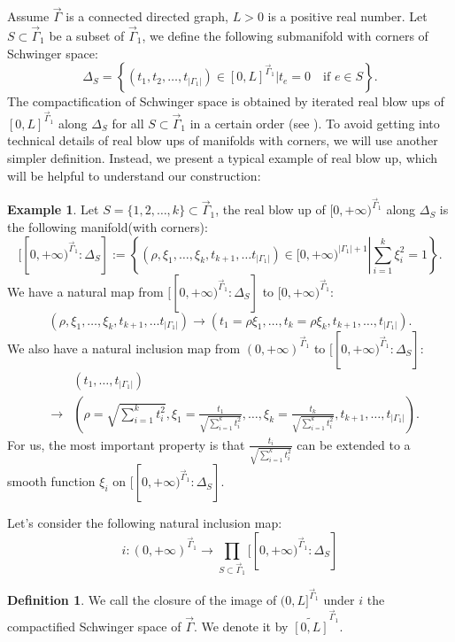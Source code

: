 \documentclass[11pt]{amsart}
\theoremstyle{definition}
\newtheorem{exa}[thm]{Example}
\newtheorem{defn}[thm]{Definition}
\theoremstyle{remark}
\numberwithin{equation}{section}
\begin{document}
Assume $\vec{\Gamma}$ is a connected directed graph, $L > 0$ is a positive real
number. Let $S \subset \vec{\Gamma}_1$ be a subset of $\vec{\Gamma}_1$, we define the
following submanifold with corners of Schwinger space:
\[ \Delta_S = \left\{ (t_1, t_2, \ldots, t_{| \Gamma_1 |}) \in [0, L]^{\vec{\Gamma}_1} |  t_e = 0 \quad \text{if } e \in S \right\} . \]
The compactification of Schwinger space is obtained by iterated real blow ups
of $[0, L]^{\vec{\Gamma}_1}$ along $\Delta_S$ for all $S \subset \vec{\Gamma}_1$ in
a certain order (see {\cite{Ammann2019ACO,epub47792}}). To avoid getting into
technical details of real blow ups of manifolds with corners, we will use
another simpler definition. Instead, we present a typical example of real blow
up, which will be helpful to understand our construction:
\begin{exa}
  Let $S = \{ 1, 2, \ldots, k \} \subset \vec{\Gamma}_1$, the real blow up of $[0,
  + \infty)^{\vec{\Gamma}_1}$ along $\Delta_S$ is the following manifold(with
  corners):
  \[ [[0, + \infty)^{\vec{\Gamma}_1 } : \Delta_S] := \left\{ (\rho, \xi_1,
     \ldots, \xi_k, t_{k + 1}, \ldots t_{| \Gamma_1 |}) \in [0, + \infty)^{|
     \Gamma_1 | + 1} \left| \sum_{i = 1}^k \xi_i^2 = 1 \right. \right\} . \]
  We have a natural map from $[[0, + \infty)^{\vec{\Gamma}_1 } : \Delta_S]$ to
  $[0, + \infty)^{\vec{\Gamma}_1 }$:
  \[ (\rho, \xi_1, \ldots, \xi_k, t_{k + 1}, \ldots t_{| \Gamma_1 |})
     \rightarrow (t_1 = \rho \xi_1, \ldots, t_k = \rho \xi_k, t_{k + 1},
     \ldots, t_{| \Gamma_1 |}) . \]
  We also have a natural inclusion map from $(0, + \infty)^{\vec{\Gamma}_1 }$ to
  $[[0, + \infty)^{\vec{\Gamma}_1 } : \Delta_S]$:
  \begin{eqnarray*}
    &  & (t_1, \ldots, t_{| \Gamma_1 |})\\
    & \rightarrow & \left( \rho = \sqrt{\sum_{i = 1}^k t_i^2}, \xi_1 =
    \frac{t_1}{\sqrt{\sum_{i = 1}^k t_i^2}}, \ldots, \xi_k =
    \frac{t_k}{\sqrt{\sum_{i = 1}^k t_i^2}}, t_{k + 1}, \ldots, t_{| \Gamma_1
    |} \right) .
  \end{eqnarray*}
  For us, the most important property is that $\frac{t_i}{\sqrt{\sum_{i = 1}^k
  t_i^2}}$ can be extended to a smooth function $\xi_i$ on $[[0, + \infty)^{\vec{\Gamma}_1 } : \Delta_S]$.
\end{exa}

Let's consider the following natural inclusion map:
\[ i : (0, + \infty)^{\vec{\Gamma}_1 } \rightarrow \prod_{S \subset \vec{\Gamma}_1}
   [[0, + \infty)^{\vec{\Gamma}_1 } : \Delta_S] \]
\begin{defn}
  We call the closure of the image of $(0, L]^{\vec{\Gamma}_1 }$ under $i$ the
  {{compactified Schwinger space}} of $\vec{\Gamma}$. We denote it by
  $\widetilde{[0, L]}^{\vec{\Gamma}_1 }$.
\end{defn}
\end{document}
